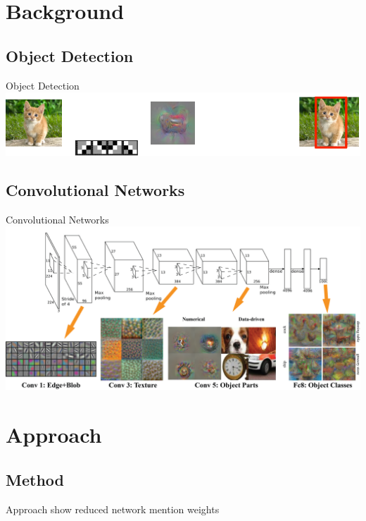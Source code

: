 \documentclass{beamer}
\begin{document}
\begin{darkframes}
    \section{Background}
\subsection{Object Detection}
	\begin{frame}{Object Detection}
	\includegraphics[width=\textwidth]{fig/ObjectDetection}
	\end{frame}
	\subsection{Convolutional Networks}
		\begin{frame}{Convolutional Networks}
	\includegraphics[width=\textwidth]{fig/cnn}
\end{frame}

    
    \section{Approach}
  \subsection{Method}
    \begin{frame}{Approach}
  show reduced network mention weights
    \end{frame}
    

\end{darkframes}
\end{document}
